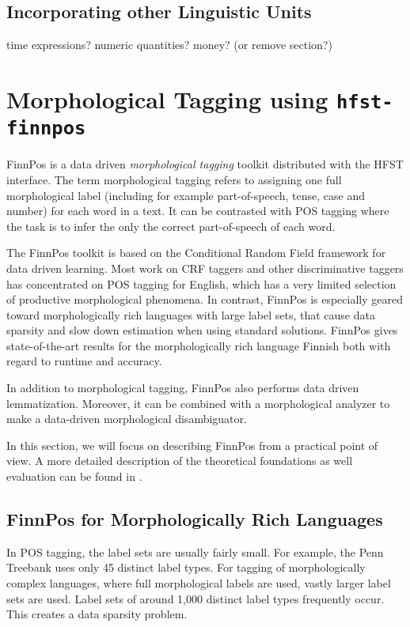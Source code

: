 \documentclass{llncs}
\begin{document}
\subsection{Incorporating other Linguistic Units}

time expressions? numeric quantities? money? (or remove section?)

\section{Morphological Tagging using {\tt hfst-finnpos}}\label{sec:morph-tagging}

FinnPos \cite{silfverberg/2015} is a data driven {\it morphological
  tagging} toolkit distributed with the HFST interface. The term
morphological tagging \cite{chrupala/2008} refers to assigning one full
morphological label (including for example part-of-speech, tense, case
and number) for each word in a text. It can be contrasted with POS
tagging where the task is to infer the only the correct part-of-speech
of each word.

The FinnPos toolkit is based on the Conditional Random Field framework
\cite{lafferty/2001} for data driven learning. Most work on CRF
taggers and other discriminative taggers has concentrated on POS
tagging for English, which has a very limited selection of productive
morphological phenomena. In contrast, FinnPos is especially geared
toward morphologically rich languages with large label sets, that
cause data sparsity and slow down estimation when using standard
solutions. FinnPos gives state-of-the-art results for the
morphologically rich language Finnish \cite{silfverberg/2015} both
with regard to runtime and accuracy.

In addition to morphological tagging, FinnPos also performs data
driven lemmatization. Moreover, it can be combined with a
morphological analyzer to make a data-driven morphological
disambiguator.

In this section, we will focus on describing FinnPos from a
practical point of view. A more detailed description of the theoretical foundations as well evaluation can be found in
\cite{silfverberg/2015}.

\subsection{FinnPos for Morphologically Rich Languages}

In POS tagging, the label sets are usually fairly small. For example,
the Penn Treebank uses only 45 distinct label types. For tagging of
morphologically complex languages, where full morphological labels are
used, vastly larger label sets are used. Label sets of around 1,000
distinct label types frequently occur. This creates a data sparsity problem.
\end{document}
